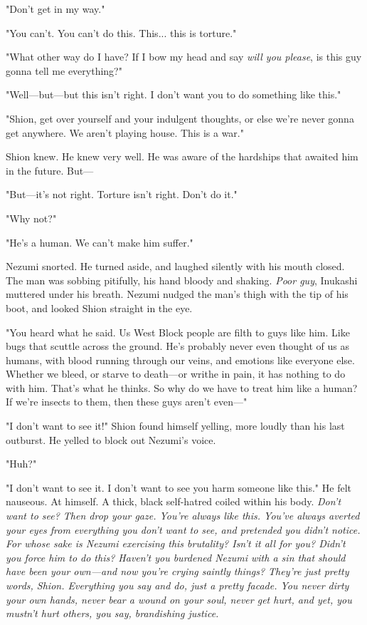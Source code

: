 "Don't get in my way."

"You can't. You can't do this. This... this is torture."

"What other way do I have? If I bow my head and say \emph{will you please}, is
this guy gonna tell me everything?"

"Well---but---but this isn't right. I don't want you to do something like
this."

"Shion, get over yourself and your indulgent thoughts, or else we're
never gonna get anywhere. We aren't playing house. This is a war."

Shion knew. He knew very well. He was aware of the hardships that
awaited him in the future. But---

"But---it's not right. Torture isn't right. Don't do it."

"Why not?"

"He's a human. We can't make him suffer."

Nezumi snorted. He turned aside, and laughed silently with his mouth
closed. The man was sobbing pitifully, his hand bloody and shaking. \emph{Poor
guy}, Inukashi muttered under his breath. Nezumi nudged the man's thigh
with the tip of his boot, and looked Shion straight in the eye.

"You heard what he said. Us West Block people are filth to guys like
him. Like bugs that scuttle across the ground. He's probably never even
thought of us as humans, with blood running through our veins, and
emotions like everyone else. Whether we bleed, or starve to death---or
writhe in pain, it has nothing to do with him. That's what he thinks. So
why do we have to treat him like a human? If we're insects to them, then
these guys aren't even---"

"I don't want to see it!" Shion found himself yelling, more loudly than
his last outburst. He yelled to block out Nezumi's voice.

"Huh?"

"I don't want to see it. I don't want to see you harm someone like
this." He felt nauseous. At himself. A thick, black self-hatred coiled
within his body. \emph{Don't want to see? Then drop your gaze. You're always
like this. You've always averted your eyes from everything you don't
want to see, and pretended you didn't notice. For whose sake is Nezumi
exercising this brutality? Isn't it all for you? Didn't you force him to
do this? Haven't you burdened Nezumi with a sin that should have been
your own---and now you're crying saintly things? They're just pretty
words, Shion. Everything you say and do, just a pretty facade. You never
dirty your own hands, never bear a wound on your soul, never get hurt,
and yet, \emph{you mustn't hurt others,} you say, brandishing justice.}

